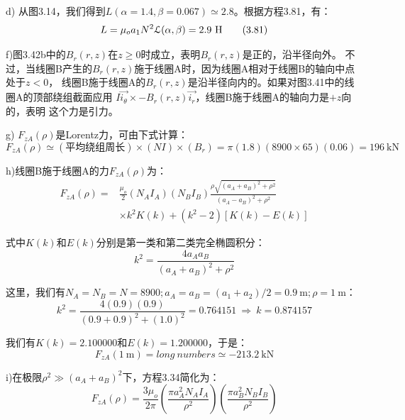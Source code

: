 d) 从图3.14，我们得到$L(\alpha=1.4, \beta=0.067)\simeq 2.8$。根据方程3.81，有：
\begin{equation*}
L=\mu_{o}a_{1}N^{2}\mathcal{L}(\alpha,\beta)\\%
=2.9\ \mathrm{H} \tag{3.81}
\end{equation*}

f)图3.42b中的$B_r(r, z)$在$z\ge 0$时成立，表明$B_r(r, z)$是正的，沿半径向外。
不过，当线圈B产生的$B_r(r, z)$施于线圈A时，因为线圈A相对于线圈B的轴向中点处于$z<0$，
线圈B施于线圈A的$B_r(r, z)$是沿半径向内的。如果对图3.41中的线圈A的顶部绕组截面应用
$I\vec{i_\theta}\times-B_r(r,z)\vec{i_r}$，线圈B施于线圈A的轴向力是$+z$向的，表明
这个力是引力。

g) $F_{zA}(\rho)$是Lorentz力，可由下式计算： 
\begin{equation*}
F_{zA}(\rho)\simeq (\mbox{平均绕组周长})\times(NI)\times(B_r)=\pi(1.8)(8900\times 65)(0.06)=196\ \mathrm{kN}
\end{equation*}

h)线圈B施于线圈A的力$F_{zA}(\rho)$为：
\begin{equation*}
\begin{split}
F_{zA}(\rho)=&\frac{\mu_{o}}{2}(N_{A}I_{A})(N_{B}I_{B})\frac{\rho\sqrt{(a_{A}+a_{B})^{2}+\rho^{2}}}{(a_{A}-a_{B})^{2}+\rho^{2}}\\
&\times{k^{2}K(k)+(k^{2}-2)[K(k)-E(k)]}%
\end{split} \tag{3.34}
\end{equation*}

式中$K(k)$和$E(k)$分别是第一类和第二类完全椭圆积分：
\begin{equation*}
k^{2}=\frac{4a_{A}a_{B}}{(a_{A}+a_{B})^{2}+\rho^{2}}\tag{3.36}%
\end{equation*}

这里，我们有$N_A=N_B=N =8900; a_A=a_B=(a_1+a_2)/2=0.9\ \mathrm{m}; \rho=1\ \mathrm{m}$：
\begin{equation*}
k^2=\frac{4(0.9)(0.9)}{(0.9+0.9)^2+(1.0)^2}=0.764151\ \Rightarrow\ k=0.874157 
\end{equation*}

我们有$K(k)=2.100000$和$E(k)=1.200000$，于是：
\begin{equation*}
F_{zA}(1\ \mathrm{m})=long\ numbers\simeq -213.2\ \mathrm{kN}
\end{equation*}


i)在极限$ρ^2\gg(a_A+a_B)^2$下，方程3.34简化为：
\begin{equation*}
F_{zA}(\rho)=\frac{3\mu_{o}}{2\pi}(\frac{\pi a_{A}^{2}N_{A}I_{A}}{\rho^{2}})(\frac{\pi a_{B}^{2}N_{B}I_{B}}{\rho^{2}})\tag{3.39c}%
\end{equation*}

